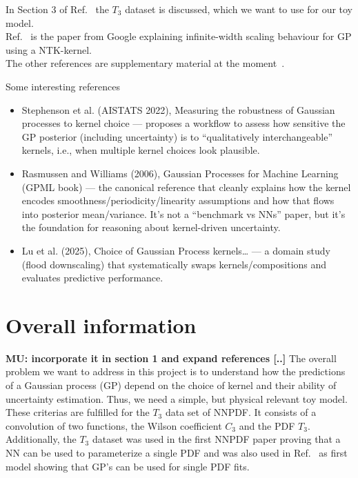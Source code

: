 \documentclass[11pt,a4paper]{article}
\begin{document}
In Section 3 of Ref.~\cite{Candido:2024hjt} the $T_3$ dataset is discussed, which we want to use for our toy model.\\
Ref.~\cite{Lee_2020} is the paper from Google explaining infinite-width scaling behaviour for GP using a NTK-kernel.\\
The other references are supplementary material at the moment~\cite{Medrano:2025cmg,Halverson:2020trp,DelDebbio:2024qfh,DelDebbio:2007ee}.


Some interesting references
\begin{itemize}
    \item Stephenson et al. (AISTATS 2022), Measuring the robustness of Gaussian processes to kernel choice — proposes a workflow to assess how sensitive the GP posterior (including uncertainty) is to “qualitatively interchangeable” kernels, i.e., when multiple kernel choices look plausible.
    \item Rasmussen and Williams (2006), Gaussian Processes for Machine Learning (GPML book) — the canonical reference that cleanly explains how the kernel encodes smoothness/periodicity/linearity assumptions and how that flows into posterior mean/variance. It’s not a “benchmark vs NNs” paper, but it’s the foundation for reasoning about kernel-driven uncertainty.
\item  Lu et al. (2025), Choice of Gaussian Process kernels… — a domain study (flood downscaling) that systematically swaps kernels/compositions and evaluates predictive performance. 
\end{itemize}





    
\section{Overall information}
{\bf MU: incorporate it in section 1 and expand references [..]}
The overall problem we want to address in this project is to understand how the predictions of a Gaussian process (GP) depend on the choice of kernel and their ability of uncertainty estimation.
Thus, we need a simple, but physical relevant toy model. These criterias are fulfilled for the $T_3$ data set of NNPDF. It consists of a convolution of two functions, the Wilson coefficient $C_3$ and the PDF $T_3$.
Additionally, the $T_3$ dataset was used in the first NNPDF paper proving that a NN can be used to parameterize a single PDF and was also used in Ref.~\cite{DelDebbio:2024qfh} as first model showing that GP's can be used for single PDF fits.
\end{document}
